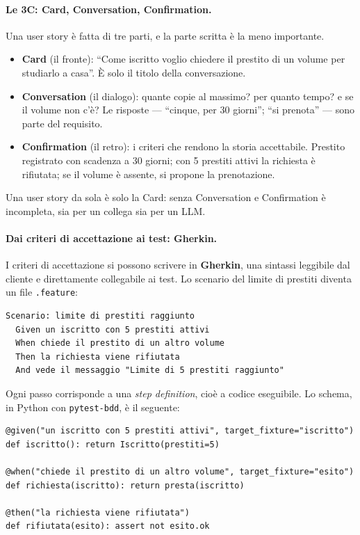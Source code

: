\documentclass[12pt]{extarticle}
\begin{document}
\paragraph{Le 3C: Card, Conversation, Confirmation.}
Una user story è fatta di tre parti, e la parte scritta è la meno importante.

\begin{itemize}
    \item \textbf{Card} (il fronte): ``Come iscritto voglio chiedere il prestito di un volume per studiarlo a casa''. È solo il titolo della conversazione.
    \item \textbf{Conversation} (il dialogo): quante copie al massimo? per quanto tempo? e se il volume non c'è? Le risposte --- ``cinque, per 30 giorni''; ``si prenota'' --- sono parte del requisito.
    \item \textbf{Confirmation} (il retro): i criteri che rendono la storia accettabile. Prestito registrato con scadenza a 30 giorni; con 5 prestiti attivi la richiesta è rifiutata; se il volume è assente, si propone la prenotazione.
\end{itemize}

\noindent Una user story da sola è solo la Card: senza Conversation e Confirmation è incompleta, sia per un collega sia per un LLM.

\paragraph{Dai criteri di accettazione ai test: Gherkin.}
I criteri di accettazione si possono scrivere in \textbf{Gherkin}, una sintassi leggibile dal cliente e direttamente collegabile ai test. Lo scenario del limite di prestiti diventa un file \texttt{.feature}:

\begin{lstlisting}
Scenario: limite di prestiti raggiunto
  Given un iscritto con 5 prestiti attivi
  When chiede il prestito di un altro volume
  Then la richiesta viene rifiutata
  And vede il messaggio "Limite di 5 prestiti raggiunto"
\end{lstlisting}

\noindent Ogni passo corrisponde a una \textit{step definition}, cioè a codice eseguibile. Lo schema, in Python con \texttt{pytest-bdd}, è il seguente:

\begin{lstlisting}
@given("un iscritto con 5 prestiti attivi", target_fixture="iscritto")
def iscritto(): return Iscritto(prestiti=5)

@when("chiede il prestito di un altro volume", target_fixture="esito")
def richiesta(iscritto): return presta(iscritto)

@then("la richiesta viene rifiutata")
def rifiutata(esito): assert not esito.ok
\end{lstlisting}
\end{document}
